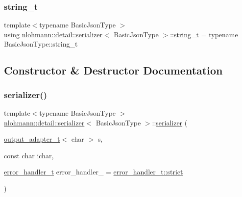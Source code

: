 \mbox{\label{classnlohmann_1_1detail_1_1serializer_ad08aa54fac1dd0a453320c54137d45ba}} 
\subsubsection{\texorpdfstring{string\+\_\+t}{string\_t}}
{\footnotesize\ttfamily template$<$typename Basic\+Json\+Type $>$ \\
using \hyperlink{classnlohmann_1_1detail_1_1serializer}{nlohmann\+::detail\+::serializer}$<$ Basic\+Json\+Type $>$\+::\hyperlink{classnlohmann_1_1detail_1_1serializer_ad08aa54fac1dd0a453320c54137d45ba}{string\+\_\+t} =  typename Basic\+Json\+Type\+::string\+\_\+t\hspace{0.3cm}{\ttfamily [private]}}



\subsection{Constructor \& Destructor Documentation}
\mbox{\label{classnlohmann_1_1detail_1_1serializer_ac010525281d97867ee842da37294fe83}} 
\subsubsection{\texorpdfstring{serializer()}{serializer()}\hspace{0.1cm}{\footnotesize\ttfamily [1/3]}}
{\footnotesize\ttfamily template$<$typename Basic\+Json\+Type $>$ \\
\hyperlink{classnlohmann_1_1detail_1_1serializer}{nlohmann\+::detail\+::serializer}$<$ Basic\+Json\+Type $>$\+::\hyperlink{classnlohmann_1_1detail_1_1serializer}{serializer} (\begin{DoxyParamCaption}\item[{\hyperlink{namespacenlohmann_1_1detail_a9b680ddfb58f27eb53a67229447fc556}{output\+\_\+adapter\+\_\+t}$<$ char $>$}]{s,  }\item[{const char}]{ichar,  }\item[{\hyperlink{namespacenlohmann_1_1detail_a5a76b60b26dc8c47256a996d18d967df}{error\+\_\+handler\+\_\+t}}]{error\+\_\+handler\+\_\+ = {\ttfamily \hyperlink{namespacenlohmann_1_1detail_a5a76b60b26dc8c47256a996d18d967dfa2133fd717402a7966ee88d06f9e0b792}{error\+\_\+handler\+\_\+t\+::strict}} }\end{DoxyParamCaption})\hspace{0.3cm}{\ttfamily [inline]}}


